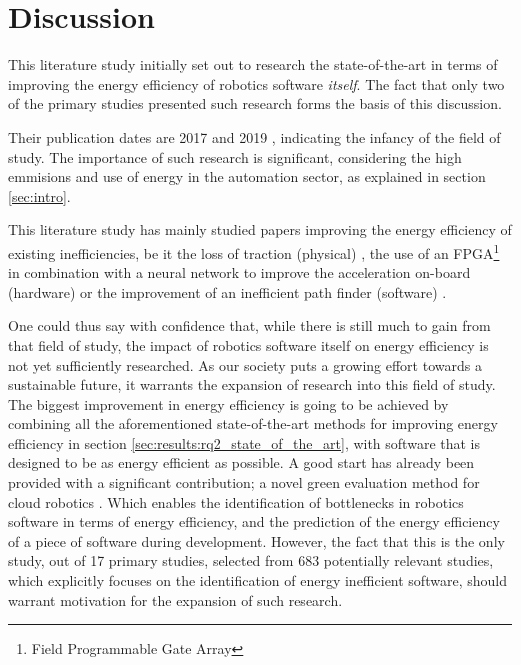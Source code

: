 \section{Discussion}
\label{sec:discussion}
This literature study initially set out to research the state-of-the-art in terms of improving the
energy efficiency of robotics software \textit{itself}.
The fact that only two of the primary studies presented such research forms the basis of this discussion.

\vspace{2mm}

Their publication dates are 2017 \cite{hou2017novel_cloud_evaluation_model} and 2019 \cite{rahman2019cloud_robot_offloading}, 
indicating the infancy of the field of study. The importance of such research is significant, 
considering the high emmisions and use of energy in the automation sector, as explained in section \ref{sec:intro}.

\vspace{2mm}

This literature study has mainly studied papers improving the energy efficiency of existing inefficiencies, 
be it the loss of traction (physical) \cite{kim2016firefighting_robot}, 
the use of an FPGA\footnote{Field Programmable Gate Array} in combination with a neural network
to improve the acceleration on-board (hardware) \cite{cheng2018FPGA_image_recognition} 
or the improvement of an inefficient path finder (software) \cite{mei2006mobile_exploration}.

\vspace{2mm}

One could thus say with confidence that, while there is still much to gain from that field of study,
the impact of robotics software itself on energy efficiency is not yet sufficiently researched.
As our society puts a growing effort towards a sustainable future, it warrants the expansion of research into this field of study.
The biggest improvement in energy efficiency is going to be achieved by combining all the aforementioned state-of-the-art methods for improving 
energy efficiency in section \ref{sec:results:rq2_state_of_the_art}, with software that is designed to be as energy efficient as possible.
A good start has already been provided with a significant contribution; 
a novel green evaluation method for cloud robotics \cite{hou2017novel_cloud_evaluation_model}.
Which enables the identification of bottlenecks in robotics software in terms of energy efficiency, 
and the prediction of the energy efficiency of a piece of software during development.
However, the fact that this is the only study, out of 17 primary studies, selected from 683 potentially relevant studies, 
which explicitly focuses on the identification of energy inefficient software, should warrant motivation for
the expansion of such research.